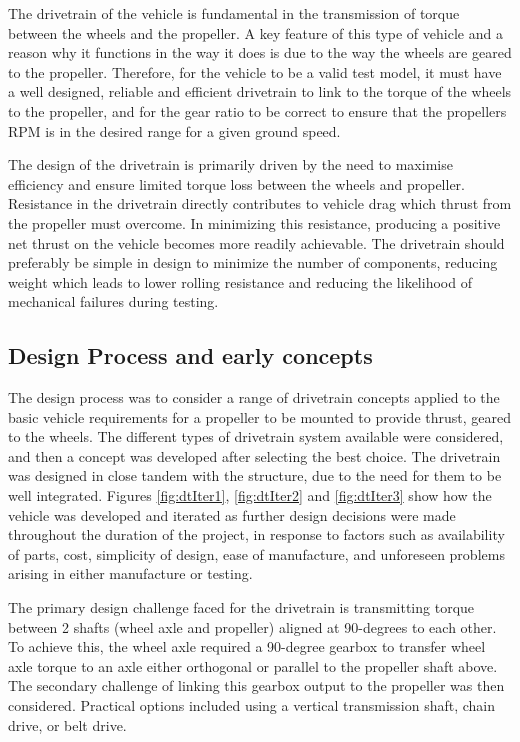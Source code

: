 
The drivetrain of the vehicle is fundamental in the transmission of torque between the wheels and the propeller. A key feature of this type of vehicle and a reason why it functions in the way it does is due to the way the wheels are geared to the propeller. Therefore, for the vehicle to be a valid test model, it must have a well designed, reliable and efficient drivetrain to link to the torque of the wheels to the propeller, and for the gear ratio to be correct to ensure that the propellers RPM is in the desired range for a given ground speed.

The design of the drivetrain is primarily driven by the need to maximise efficiency and ensure limited torque loss between the wheels and propeller. Resistance in the drivetrain directly contributes to vehicle drag which thrust from the propeller must overcome. In minimizing this resistance, producing a positive net thrust on the vehicle becomes more readily achievable. The drivetrain should preferably be simple in design to minimize the number of components, reducing weight which leads to lower rolling resistance and reducing the likelihood of mechanical failures during testing.

\subsection{Design Process and early concepts}

The design process was to consider a range of drivetrain concepts applied to the basic vehicle requirements for a propeller to be mounted to provide thrust, geared to the wheels. The different types of drivetrain system available were considered, and then a concept was developed after selecting the best choice. The drivetrain was designed in close tandem with the structure, due to the need for them to be well integrated. Figures \ref{fig:dtIter1}, \ref{fig:dtIter2} and \ref{fig:dtIter3} show how the vehicle was developed and iterated as further design decisions were made throughout the duration of the project, in response to factors such as availability of parts, cost, simplicity of design, ease of manufacture, and unforeseen problems arising in either manufacture or testing.

The primary design challenge faced for the drivetrain is transmitting torque between 2 shafts (wheel axle and propeller) aligned at 90-degrees to each other. To achieve this, the wheel axle required a 90-degree gearbox to transfer wheel axle torque to an axle either orthogonal or parallel to the propeller shaft above. The secondary challenge of linking this gearbox output to the propeller was then considered. Practical options included using a vertical transmission shaft, chain drive, or belt drive.

